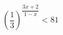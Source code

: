 \begin{ex}
	\begin{condition}
	\( \left( \dfrac{1}{3} \right)^{\dfrac{3x+2}{1-x}}<81 \)
	\end{condition}
\end{ex}